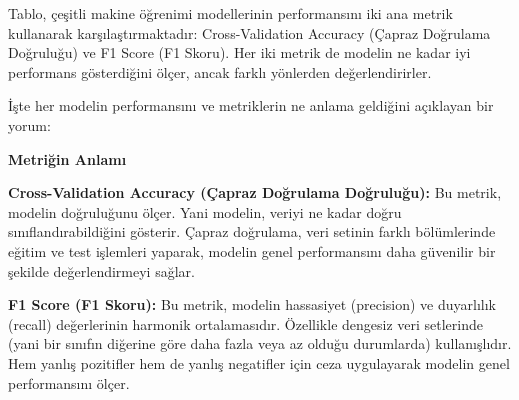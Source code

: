 \documentclass[twocolumn]{article}
\begin{document}
	
	Tablo, çeşitli makine öğrenimi modellerinin performansını iki ana metrik kullanarak karşılaştırmaktadır: Cross-Validation Accuracy (Çapraz Doğrulama Doğruluğu) ve F1 Score (F1 Skoru). Her iki metrik de modelin ne kadar iyi performans gösterdiğini ölçer, ancak farklı yönlerden değerlendirirler.
	
	İşte her modelin performansını ve metriklerin ne anlama geldiğini açıklayan bir yorum:
	\begin{flushleft}
		\textbf{Metriğin Anlamı}
		
		\textbf{Cross-Validation Accuracy (Çapraz Doğrulama Doğruluğu):}
		Bu metrik, modelin doğruluğunu ölçer. Yani modelin, veriyi ne kadar doğru sınıflandırabildiğini gösterir. Çapraz doğrulama, veri setinin farklı bölümlerinde eğitim ve test işlemleri yaparak, modelin genel performansını daha güvenilir bir şekilde değerlendirmeyi sağlar.
		
		\textbf{F1 Score (F1 Skoru):}
		Bu metrik, modelin hassasiyet (precision) ve duyarlılık (recall) değerlerinin harmonik ortalamasıdır. Özellikle dengesiz veri setlerinde (yani bir sınıfın diğerine göre daha fazla veya az olduğu durumlarda) kullanışlıdır. Hem yanlış pozitifler hem de yanlış negatifler için ceza uygulayarak modelin genel performansını ölçer.
	\end{flushleft}
	
\end{document}
